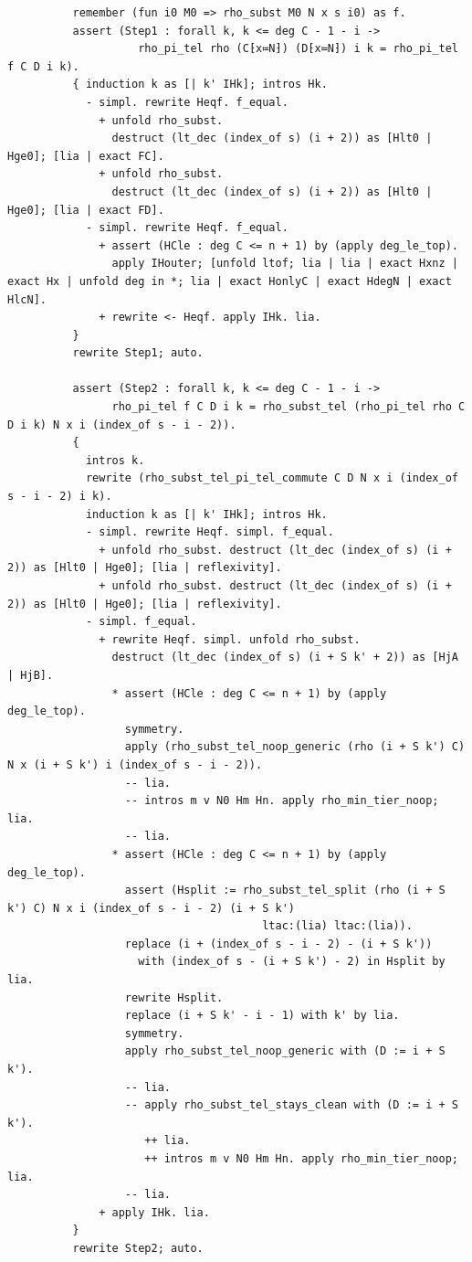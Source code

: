 \begin{latin}
\begin{verbatim}
          remember (fun i0 M0 => rho_subst M0 N x s i0) as f.
          assert (Step1 : forall k, k <= deg C - 1 - i ->
                    rho_pi_tel rho (C⁅x≔N⁆) (D⁅x≔N⁆) i k = rho_pi_tel f C D i k).
          { induction k as [| k' IHk]; intros Hk.
            - simpl. rewrite Heqf. f_equal.
              + unfold rho_subst.
                destruct (lt_dec (index_of s) (i + 2)) as [Hlt0 | Hge0]; [lia | exact FC].
              + unfold rho_subst.
                destruct (lt_dec (index_of s) (i + 2)) as [Hlt0 | Hge0]; [lia | exact FD].
            - simpl. rewrite Heqf. f_equal.
              + assert (HCle : deg C <= n + 1) by (apply deg_le_top).
                apply IHouter; [unfold ltof; lia | lia | exact Hxnz | exact Hx | unfold deg in *; lia | exact HonlyC | exact HdegN | exact HlcN].
              + rewrite <- Heqf. apply IHk. lia.
          }
          rewrite Step1; auto.

          assert (Step2 : forall k, k <= deg C - 1 - i ->
                rho_pi_tel f C D i k = rho_subst_tel (rho_pi_tel rho C D i k) N x i (index_of s - i - 2)).
          {
            intros k.
            rewrite (rho_subst_tel_pi_tel_commute C D N x i (index_of s - i - 2) i k).
            induction k as [| k' IHk]; intros Hk.
            - simpl. rewrite Heqf. simpl. f_equal.
              + unfold rho_subst. destruct (lt_dec (index_of s) (i + 2)) as [Hlt0 | Hge0]; [lia | reflexivity].
              + unfold rho_subst. destruct (lt_dec (index_of s) (i + 2)) as [Hlt0 | Hge0]; [lia | reflexivity].
            - simpl. f_equal.
              + rewrite Heqf. simpl. unfold rho_subst.
                destruct (lt_dec (index_of s) (i + S k' + 2)) as [HjA | HjB].
                * assert (HCle : deg C <= n + 1) by (apply deg_le_top).
                  symmetry.
                  apply (rho_subst_tel_noop_generic (rho (i + S k') C) N x (i + S k') i (index_of s - i - 2)).
                  -- lia.
                  -- intros m v N0 Hm Hn. apply rho_min_tier_noop; lia.
                  -- lia.
                * assert (HCle : deg C <= n + 1) by (apply deg_le_top).
                  assert (Hsplit := rho_subst_tel_split (rho (i + S k') C) N x i (index_of s - i - 2) (i + S k')
                                       ltac:(lia) ltac:(lia)).
                  replace (i + (index_of s - i - 2) - (i + S k'))
                    with (index_of s - (i + S k') - 2) in Hsplit by lia.
                  rewrite Hsplit.
                  replace (i + S k' - i - 1) with k' by lia.
                  symmetry.
                  apply rho_subst_tel_noop_generic with (D := i + S k').
                  -- lia.
                  -- apply rho_subst_tel_stays_clean with (D := i + S k').
                     ++ lia.
                     ++ intros m v N0 Hm Hn. apply rho_min_tier_noop; lia.
                  -- lia.
              + apply IHk. lia.
          }
          rewrite Step2; auto.


\end{verbatim}
\end{latin}
